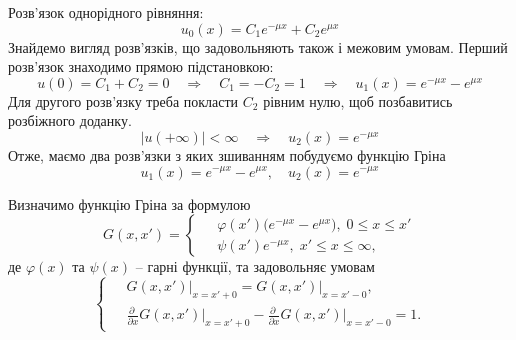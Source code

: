 Розв'язок однорідного рівняння:
\begin{equation}
    u_0(x) = C_1 e^{-\mu x} + C_2 e^{\mu x}
\end{equation}
Знайдемо вигляд розв'язків, що задовольняють також і межовим умовам. Перший розв'язок знаходимо прямою підстановкою:
\begin{equation*}
    u(0) = C_1 + C_2 = 0 \quad\Rightarrow\quad C_1 = - C_2 = 1 \quad\Rightarrow\quad u_1(x) = e^{-\mu x} - e^{\mu x}
\end{equation*}
Для другого розв'язку треба покласти $C_2$ рівним нулю, щоб позбавитись розбіжного доданку.
\begin{equation*}
    |u(+\infty)| < \infty \quad\Rightarrow\quad u_2(x) = e^{-\mu x}
\end{equation*}
Отже, маємо два розв'язки з яких зшиванням побудуємо функцію Гріна
\begin{equation}
    u_1(x) = e^{-\mu x} - e^{\mu x}, \quad u_2(x) = e^{-\mu x}
\end{equation}

Визначимо функцію Гріна за формулою
\begin{equation} \label{green-draft}
    G(x,x') = 
    \left\{ \begin{aligned}
        \;& \varphi(x') \big( e^{-\mu x} - e^{\mu x} \big), \; 0 \leq x \leq x' \\
          & \psi(x') e^{-\mu x}, \; x' \leq x \leq \infty,
    \end{aligned} \right.
\end{equation}
де $\varphi(x)$ та $\psi(x)$ -- гарні функції, та задовольняє умовам
\begin{equation} \label{green-cond}
    \left\{ \begin{aligned}
        \;& G(x,x')\bigg|_{x = x'+0} = G(x,x')\bigg|_{x = x'-0},\\
          & \frac{\partial \;}{\partial x}G(x,x')\bigg|_{x = x'+0} - \frac{\partial \;}{\partial x} G(x,x')\bigg|_{x = x'-0} = 1.
    \end{aligned} \right.
\end{equation}

